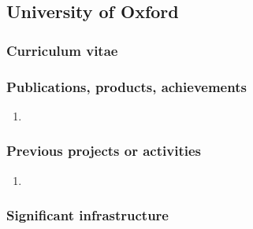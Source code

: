 \subsection*{University of Oxford}




\subsubsection*{Curriculum vitae}

%
%

\subsubsection*{Publications, products, achievements}

\begin{enumerate}
\item {}
\end{enumerate}

\subsubsection*{Previous projects or activities}

\begin{enumerate}
\item {}
\end{enumerate}

\subsubsection*{Significant infrastructure}

